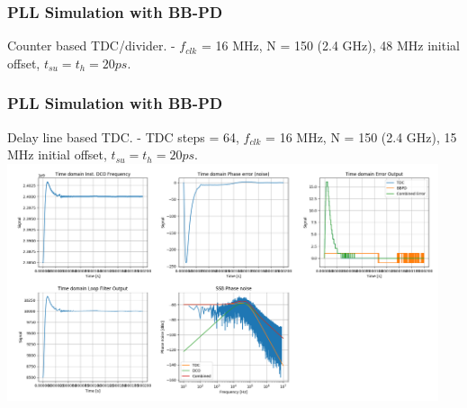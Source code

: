 \documentclass[t, screen, aspectratio=43]{beamer}
\begin{document}
\begin{frame}
	\frametitle{PLL Simulation with BB-PD}
	\begin{block}{Counter based TDC/divider.}
			\scriptsize
			- $f_{clk}$ = 16 MHz, N = 150 (2.4 GHz), 48 MHz initial offset, $t_{su} = t_h = 20 ps$.
	\end{block}
\end{frame}


\begin{frame}
	\frametitle{PLL Simulation with BB-PD}
	\begin{block}{Delay line based TDC.}
			\scriptsize
			- TDC steps = 64, $f_{clk}$ = 16 MHz, N = 150 (2.4 GHz), 15 MHz initial offset, $t_{su} = t_h = 20 ps$.
			\includegraphics[width=0.95\textwidth, angle=0]{pllsim_fixed_bbpd.png}
	\end{block}
\end{frame}
\end{document}
